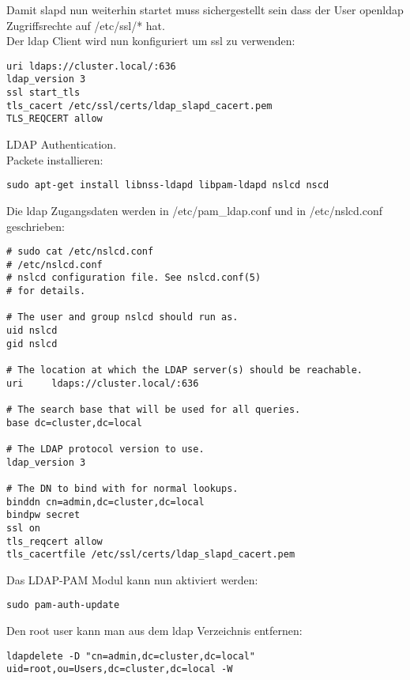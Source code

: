Damit slapd nun weiterhin startet muss sichergestellt sein dass der User openldap Zugriffsrechte auf /etc/ssl/* hat.\\
Der ldap Client wird nun konfiguriert um ssl zu verwenden:
\begin{lstlisting}[style=Bash]
uri ldaps://cluster.local/:636
ldap_version 3
ssl start_tls
tls_cacert /etc/ssl/certs/ldap_slapd_cacert.pem
TLS_REQCERT allow
\end{lstlisting}
LDAP Authentication.\\
Packete installieren:
\begin{lstlisting}[style=Bash]
sudo apt-get install libnss-ldapd libpam-ldapd nslcd nscd
\end{lstlisting}
Die ldap Zugangsdaten werden in /etc/pam\_ldap.conf und in /etc/nslcd.conf geschrieben:
\begin{lstlisting}[style=Bash]
# sudo cat /etc/nslcd.conf 
# /etc/nslcd.conf
# nslcd configuration file. See nslcd.conf(5)
# for details.

# The user and group nslcd should run as.
uid nslcd
gid nslcd

# The location at which the LDAP server(s) should be reachable.
uri     ldaps://cluster.local/:636

# The search base that will be used for all queries.
base dc=cluster,dc=local

# The LDAP protocol version to use.
ldap_version 3

# The DN to bind with for normal lookups.
binddn cn=admin,dc=cluster,dc=local
bindpw secret
ssl on
tls_reqcert allow
tls_cacertfile /etc/ssl/certs/ldap_slapd_cacert.pem
\end{lstlisting}
Das LDAP-PAM Modul kann nun aktiviert werden: 
\begin{lstlisting}[style=Bash]
sudo pam-auth-update
\end{lstlisting}
Den root user kann man aus dem ldap Verzeichnis entfernen:
\begin{lstlisting}[style=Bash]
ldapdelete -D "cn=admin,dc=cluster,dc=local" uid=root,ou=Users,dc=cluster,dc=local -W
\end{lstlisting}
